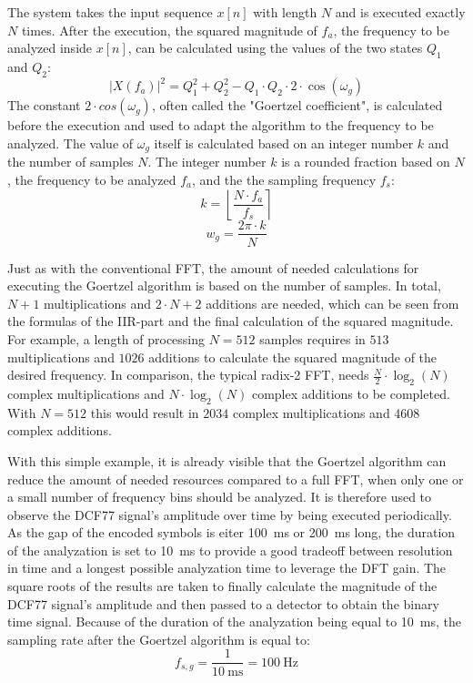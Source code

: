 \documentclass[conference]{IEEEtran}
\begin{document}
\FloatBarrier\noindent
The system takes the input sequence $x[n]$ with length $N$ and is executed exactly $N$ times.
After the execution, the squared magnitude of $f_{a}$, the frequency to be analyzed inside $x[n]$, can be calculated using the values of the two states $Q_{1}$ and $Q_{2}$:
\begin{equation}
    |X(f_{a})|^2 = Q_{1}^2 + Q_{2}^2 - Q_{1} \cdot Q_{2} \cdot 2 \cdot \cos(\omega_{g})
    \label{eqn:goertzel-mag}
\end{equation}
The constant $2 \cdot cos(\omega_{g})$, often called the "Goertzel coefficient", is calculated before the execution and used to adapt the algorithm to the frequency to be analyzed.
The value of $\omega_{g}$ itself is calculated based on an integer number $k$ and the number of samples $N$.
The integer number $k$ is a rounded fraction based on $N$, the frequency to be analyzed $f_{a}$, and the the sampling frequency $f_{s}$:
\begin{equation}
    k = \left\lfloor \frac{N \cdot f_{a}}{f_{s}} \right\rceil
    \label{eqn:goertzel-k}
\end{equation}
\begin{equation}
    w_g = \frac{2\pi \cdot k}{N}
    \label{eqn:goertzel-omega}
\end{equation}

\par
Just as with the conventional FFT, the amount of needed calculations for executing the Goertzel algorithm is based on the number of samples.
In total, $N + 1$ multiplications and $2 \cdot N + 2$ additions are needed, which can be seen from the formulas of the IIR-part and the final calculation of the squared magnitude.
For example, a length of processing $N = 512$ samples requires in $513$ multiplications and $1026$ additions to calculate the squared magnitude of the desired frequency.
In comparison, the typical radix-2 FFT, needs $\frac{N}{2} \cdot \log_{2}(N)$ complex multiplications and $N \cdot \log_{2}(N)$ complex additions to be completed. With $N = 512$ this would result in $2034$ complex multiplications and $4608$ complex additions.
\par
With this simple example, it is already visible that the Goertzel algorithm can reduce the amount of needed resources compared to a full FFT, when only one or a small number of frequency bins should be analyzed.
It is therefore used to observe the DCF77 signal's amplitude over time by being executed periodically.
As the gap of the encoded symbols is eiter \SI{100}{\milli\second} or \SI{200}{\milli\second} long, the duration of the analyzation is set to \SI{10}{\milli\second} to provide a good tradeoff between resolution in time and a longest possible analyzation time
to leverage the DFT gain.
The square roots of the results are taken to finally calculate the magnitude of the DCF77 signal's amplitude and then passed to a detector to obtain the binary time signal.
Because of the duration of the analyzation being equal to \SI{10}{\milli\second}, the sampling rate after the Goertzel algorithm is equal to:
\begin{equation}
    f_{s,g} = \frac{1}{\SI{10}{\milli\second}} = \SI{100}{\hertz}
\end{equation}
\end{document}

